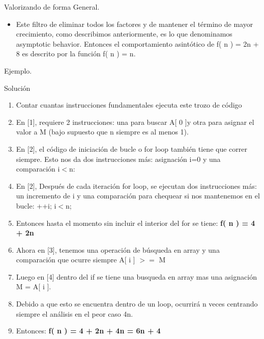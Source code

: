 \documentclass{beamer} %
\begin{document}
\begin{frame}{Valorizando de forma General.}
  \begin{itemize}
    \item Este filtro de eliminar todos los factores y de mantener el término de mayor crecimiento, como describimos anteriormente, es lo que denominamos asymptotic behavior. Entonces el comportamiento asintótico de f( n ) = 2n + 8 es descrito por la función f( n ) = n.
  \end{itemize}
\end{frame}

\begin{frame}{Ejemplo.}



\end{frame}

\begin{frame}
 \begin{block}{Solución}
  \begin{enumerate}
    \item Contar cuantas instrucciones fundamentales ejecuta este trozo de código
    \item En [1], requiere 2 instrucciones: una para buscar A[ 0 ]y otra para asignar el valor a M (bajo supuesto que n siempre es al menos 1).
    \item En [2], el código de iniciación de bucle o for loop también tiene que correr siempre. Esto nos da dos instrucciones más:  asignación i=0 y una comparación i$<$n:
    \item En [2], Después de cada iteración for loop, se ejecutan dos instrucciones más: un incremento de i y una comparación para chequear si nos mantenemos en el bucle: ++i;
i$<$n;
    \item Entonces hasta el momento sin incluir el interior del for se tiene: \textbf{f( n ) = 4 + 2n}
    \item Ahora en [3], tenemos una operación de búsqueda en array y una comparación que ocurre siempre A[ i ] $>=$ M
    \item Luego en [4]  dentro del if se tiene una busqueda en array mas una asignación  M = A[ i ].
    \item Debido a que esto se encuentra dentro de un loop, ocurrirá n veces centrando siempre el análisis en el peor caso 4n.
    \item Entonces: \textbf{f( n ) = 4 + 2n + 4n = 6n + 4}
  \end{enumerate}
 \end{block}
 \end{frame}
\end{document}
